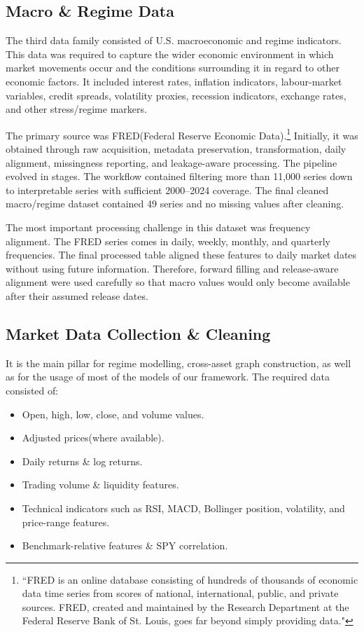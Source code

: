 \documentclass[conference]{IEEEtran}
\begin{document}
\subsection{Macro \& Regime Data}
The third data family consisted of U.S. macroeconomic and regime indicators. This data was required to capture the wider economic environment in which market movements occur and the conditions surrounding it in regard to other economic factors. It included interest rates, inflation indicators, labour-market variables, credit spreads, volatility proxies, recession indicators, exchange rates, and other stress/regime markers.

The primary source was FRED(Federal Reserve Economic Data).\footnote{``FRED is an online database consisting of hundreds of thousands of economic data time series from scores of national, international, public, and private sources. FRED, created and maintained by the Research Department at the Federal Reserve Bank of St. Louis, goes far beyond simply providing data."\cite{re3data} 
}\cite{fredSite} Initially, it was obtained through raw acquisition, metadata preservation, transformation, daily alignment, missingness reporting, and leakage-aware processing. The pipeline evolved in stages. The workflow contained filtering more than 11,000 series down to interpretable series with sufficient 2000–2024 coverage. The final cleaned macro/regime dataset contained 49 series and no missing values after cleaning.

The most important processing challenge in this dataset was frequency alignment. The FRED series comes in daily, weekly, monthly, and quarterly frequencies. The final processed table aligned these features to daily market dates without using future information. Therefore, forward filling and release-aware alignment were used carefully so that macro values would only become available after their assumed release dates.
\subsection{Market Data Collection \& Cleaning}
It is the main pillar for regime modelling, cross-asset graph construction, as well as for the usage of most of the models of our framework.
The required data consisted of:
\begin{itemize}
    \item Open, high, low, close, and volume values.
    \item Adjusted prices(where available).
    \item Daily returns \& log returns.
    \item Trading volume \& liquidity features.
    \item Technical indicators such as RSI, MACD, Bollinger position, volatility, and price-range features.
    \item Benchmark-relative features \& SPY correlation.
\end{itemize}
\end{document}
